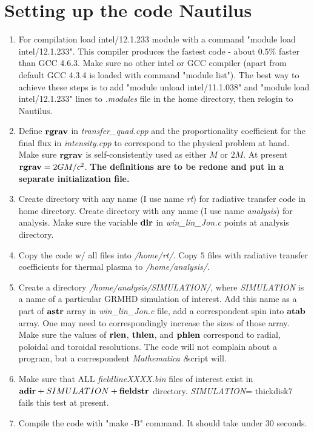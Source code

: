 \documentclass{emulateapj}
\newcommand{\mat}{\textit{Mathematica 8}}
\begin{document}
\section{Setting up the code Nautilus}
\begin{enumerate}
\item{For compilation load intel/12.1.233 module with a command "module load intel/12.1.233". This compiler produces the fastest code - about $0.5\%$ faster than GCC 4.6.3.
Make sure no other intel or GCC compiler (apart from default GCC 4.3.4 is loaded with command "module list").
The best way to achieve these steps is to add  "module unload intel/11.1.038" and "module load intel/12.1.233" lines to \textit{.modules} file in the home directory,
then relogin to Nautilus.}
\item{Define ${\bf rgrav}$ in \textit{transfer\_quad.cpp} and the proportionality coefficient for the final flux in \textit{intensity.cpp} to correspond to the physical problem at hand.
Make sure ${\bf rgrav}$ is self-consistently used as either $M$ or $2M$. At present ${\bf rgrav}=2GM/c^2$. \textbf{The definitions are to be redone and put in a separate initialization file.}}
\item{Create directory with any name (I use name \textit{rt}) for radiative transfer code in home directory. Create directory with any name (I use name \textit{analysis})
for analysis. Make sure the variable ${\bf dir}$ in \textit{win\_lin\_Jon.c} points at analysis directory.}
\item{Copy the code w/ all files into \textit{/home/rt/}. Copy $5$ files with radiative transfer coefficients for thermal plasma to \textit{/home/analysis/}.}
\item{Create a directory \textit{/home/analysis/SIMULATION/}, where \textit{SIMULATION} is a name of a particular GRMHD simulation of interest.
Add this name as a part of ${\bf astr}$ array in \textit{win\_lin\_Jon.c} file, add a correspondent spin into ${\bf atab}$ array.
One may need to correspondingly increase the sizes of those array. Make sure the values of ${\bf rlen}$, ${\bf thlen}$, and ${\bf phlen}$ correspond to radial,
poloidal and toroidal resolutions. The code will not complain about a program, but a correspondent \mat script will.}
\item{Make sure that ALL \textit{fieldlineXXXX.bin} files of interest exist in ${\bf adir}+ SIMULATION +{\bf fieldstr}$ directory. \textit{SIMULATION}= thickdisk7 fails this test at present.}
\item{Compile the code with "make -B" command. It should take under 30 seconds.}

\end{enumerate}
\end{document}
